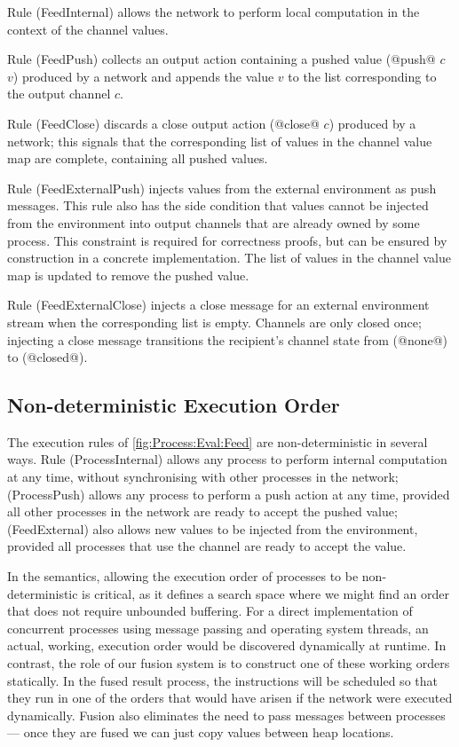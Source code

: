 Rule (FeedInternal) allows the network to perform local computation in the context of the channel values.

Rule (FeedPush) collects an output action containing a pushed value (@push@ $c$ $v$) produced by a network and appends the value $v$ to the list corresponding to the output channel $c$.

Rule (FeedClose) discards a close output action (@close@ $c$) produced by a network; this signals that the corresponding list of values in the channel value map are complete, containing all pushed values.

Rule (FeedExternalPush) injects values from the external environment as push messages.
This rule also has the side condition that values cannot be injected from the environment into output channels that are already owned by some process.
This constraint is required for correctness proofs, but can be ensured by construction in a concrete implementation.
The list of values in the channel value map is updated to remove the pushed value.

Rule (FeedExternalClose) injects a close message for an external environment stream when the corresponding list is empty.
Channels are only closed once; injecting a close message transitions the recipient's channel state from (@none@) to (@closed@).



\subsection{Non-deterministic Execution Order}
\label{s:EvaluationOrder}

The execution rules of \autoref{fig:Process:Eval:Feed} are non-deterministic in several ways. Rule (ProcessInternal) allows any process to perform internal computation at any time, without synchronising with other processes in the network; (ProcessPush) allows any process to perform a push action at any time, provided all other processes in the network are ready to accept the pushed value; (FeedExternal) also allows new values to be injected from the environment, provided all processes that use the channel are ready to accept the value.

In the semantics, allowing the execution order of processes to be non-deterministic is critical, as it defines a search space where we might find an order that does not require unbounded buffering. For a direct implementation of concurrent processes using message passing and operating system threads, an actual, working, execution order would be discovered dynamically at runtime. In contrast, the role of our fusion system is to construct one of these working orders statically. In the fused result process, the instructions will be scheduled so that they run in one of the orders that would have arisen if the network were executed dynamically. Fusion also eliminates the need to pass messages between processes --- once they are fused we can just copy values between heap locations.

